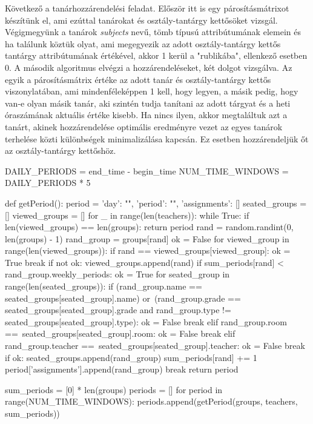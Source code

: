 Következő a tanárhozzárendelési feladat. Először itt is egy párosításmátrixot készítünk el, ami ezúttal tanárokat és osztály-tantárgy kettősöket vizsgál. Végigmegyünk a tanárok \textit{subjects} nevű, tömb típusú attribútumának elemein és ha találunk köztük olyat, ami megegyezik az adott osztály-tantárgy kettős tantárgy attribútumának értékével, akkor 1 kerül a "rublikába", ellenkező esetben 0.
A második algoritmus elvégzi a hozzárendeléseket, két dolgot vizsgálva. Az egyik a párosításmátrix értéke az adott tanár és osztály-tantárgy kettős viszonylatában, ami mindenféleképpen 1 kell, hogy legyen, a másik pedig, hogy van-e olyan másik tanár, aki szintén tudja tanítani az adott tárgyat és a heti óraszámának aktuális értéke kisebb. Ha nincs ilyen, akkor megtaláltuk azt a tanárt, akinek hozzárendelése optimális eredményre vezet az egyes tanárok terhelése közti különbségek minimalizálása kapcsán. Ez esetben hozzárendeljük őt az osztály-tantárgy kettőshöz.


\begin{python}
	DAILY_PERIODS = end_time - begin_time
	NUM_TIME_WINDOWS = DAILY_PERIODS * 5
	
	
	def getPeriod():
	period = {'day': "", 'period': "", 'assignments': []}
	seated_groups = []
	viewed_groups = []
	for _ in range(len(teachers)):
	while True:
	if len(viewed_groups) == len(groups):
	return period
	rand = random.randint(0, len(groups) - 1)
	rand_group = groups[rand]
	ok = False
	for viewed_group in range(len(viewed_groups)):
	if rand == viewed_groups[viewed_group]:
	ok = True
	break
	if not ok:
	viewed_groups.append(rand)
	if sum_periods[rand] < rand_group.weekly_periods:
	ok = True
	for seated_group in range(len(seated_groups)):
	if (rand_group.name ==
	seated_groups[seated_group].name) or\
	(rand_group.grade == 
	seated_groups[seated_group].grade and
	rand_group.type != 
	seated_groups[seated_group].type):
	ok = False
	break
	elif rand_group.room ==\
	seated_groups[seated_group].room:
	ok = False
	break
	elif rand_group.teacher ==\
	seated_groups[seated_group].teacher:
	ok = False
	break
	if ok:
	seated_groups.append(rand_group)
	sum_periods[rand] += 1
	period['assignments'].append(rand_group)
	break
	return period
	
	
	sum_periods = [0] * len(groups)
	periods = []
	for period in range(NUM_TIME_WINDOWS):
	periods.append(getPeriod(groups, teachers, sum_periods))
\end{python}

